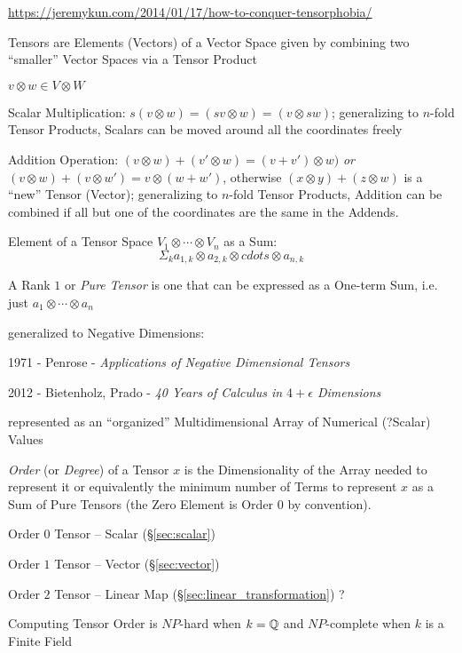\fist
\url{https://jeremykun.com/2014/01/17/how-to-conquer-tensorphobia/}

Tensors are Elements (Vectors) of a Vector Space given by
combining two ``smaller'' Vector Spaces via a Tensor Product

$v \otimes w \in V \otimes W$

Scalar Multiplication: $s(v \otimes w) = (sv \otimes w) = (v \otimes
sw)$; generalizing to  $n$-fold Tensor Products, Scalars can be moved
around all the coordinates freely

Addition Operation: $(v \otimes w) + (v' \otimes w) = (v + v') \otimes
w)$ \emph{or} $(v \otimes w) + (v \otimes w') = v \otimes (w + w')$,
otherwise $(x \otimes y) + (z \otimes w)$ is a ``new'' Tensor
(Vector); generalizing to $n$-fold Tensor Products, Addition can be
combined if all but one of the coordinates are the same in the
Addends.

Element of a Tensor Space $V_1 \otimes \cdots \otimes V_n$ as a Sum:
\[
  \Sigma_k a_{1,k} \otimes a_{2,k} \otimes cdots \otimes a_{n,k}
\]

A Rank $1$ or \emph{Pure Tensor} is one that can be expressed as a
One-term Sum, i.e. just $a_1 \otimes \cdots \otimes a_n$


\asterism

generalized to Negative Dimensions:

1971 - Penrose - \emph{Applications of Negative Dimensional Tensors}

2012 - Bietenholz, Prado - \emph{40 Years of Calculus in $4 + \epsilon$
  Dimensions}


\asterism


represented as an ``organized'' Multidimensional Array of Numerical
(?Scalar) Values

\emph{Order} (or \emph{Degree}) of a Tensor $x$ is the
Dimensionality of the Array needed to represent it or equivalently the
minimum number of Terms to represent $x$ as a Sum of Pure Tensors (the
Zero Element is Order $0$ by convention).

Order $0$ Tensor -- Scalar (\S\ref{sec:scalar})

Order $1$ Tensor -- Vector (\S\ref{sec:vector})

Order $2$ Tensor -- Linear Map (\S\ref{sec:linear_transformation}) ?

Computing Tensor Order is $NP$-hard when $k = \mathbb{Q}$ and $NP$-complete
when $k$ is a Finite Field %


\asterism


